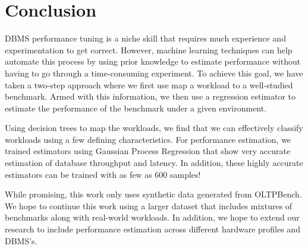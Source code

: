 \section{Conclusion} \label{sec:conclusion}

DBMS performance tuning is a niche skill that requires much experience
and experimentation to get correct. However, machine learning
techniques can help automate this process by using prior knowledge to
estimate performance without having to go through a time-consuming
experiment. To achieve this goal, we have taken a two-step approach
where we first use map a workload to a well-studied benchmark. Armed with
this information, we then use a regression estimator to estimate the
performance of the benchmark under a given environment.

Using decision trees to map the workloads, we find that we can
effectively classify workloads using a few defining
characteristics. For performance estimation, we trained estimators
using Gaussian Process Regression that show very accurate estimation
of database throughput and latency. In addition, these highly accurate
estimators can be trained with as few as 600 samples!

While promising, this work only uses synthetic data generated from
OLTPBench. We hope to continue this work using a larger dataset that
includes mixtures of benchmarks along with real-world workloads. In
addition, we hope to extend our research to include performance
estimation across different hardware profiles and DBMS's.
